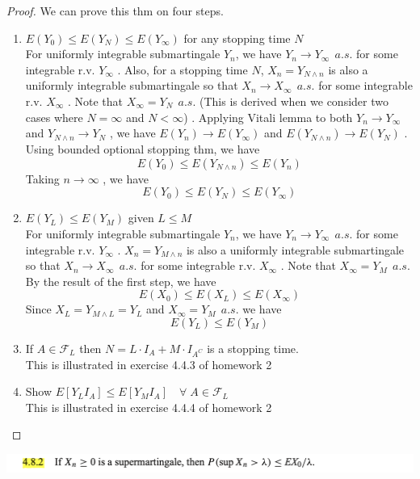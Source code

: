 \documentclass[12pt, A4]{article}
\newcommand{\F}{\mathcal{F}}
\begin{document}
\begin{proof}
    We can prove this thm on four steps.
    \begin{enumerate}
        \item $E(Y_0)\leq E(Y_N)\leq E(Y_\infty)$ for any stopping time $N$ \\
        For uniformly integrable submartingale $Y_n$, we have $Y_n\rightarrow Y_\infty\;\,a.s.$ for some integrable r.v. $Y_\infty$ . Also, for a stopping time $N$, $X_n = Y_{N\wedge n}$ is also a uniformly integrable submartingale so that $X_n\rightarrow X_\infty\;\,a.s.$ for some integrable r.v. $X_\infty$ . Note that $X_\infty = Y_N\;\,a.s.$ (This is derived when we consider two cases where $N=\infty$ and $N<\infty$) . Applying Vitali lemma to both $Y_n\rightarrow Y_\infty$ and $Y_{N\wedge n}\rightarrow Y_N$ , we have $E(Y_n) \rightarrow E(Y_\infty)$ and $E(Y_{N\wedge n})\rightarrow E(Y_N)$ . Using bounded optional stopping thm, we have $$ E(Y_0) \leq E(Y_{N\wedge n}) \leq E(Y_n)$$ Taking $n\rightarrow \infty$ , we have $$ E(Y_0) \leq E(Y_N) \leq E(Y_\infty)$$
        \item $E(Y_L)\leq E(Y_M)$ given $L\leq M$ \\
        For uniformly integrable submartingale $Y_n$, we have $Y_n\rightarrow Y_\infty\;\,a.s.$ for some integrable r.v. $Y_\infty$ . $X_n = Y_{M\wedge n}$ is also a uniformly integrable submartingale so that $X_n\rightarrow X_\infty\;\,a.s.$ for some integrable r.v. $X_\infty$ . Note that $X_\infty = Y_M\;\,a.s.$ By the result of the first step, we have $$ E(X_0) \leq E(X_L) \leq E(X_\infty) $$ Since $X_L = Y_{M\wedge L}=Y_L$ and $X_\infty = Y_M\;\,a.s.$ we have $$E(Y_L) \leq E(Y_M)$$
        \item If $A\in \F_L$ then $N = L\cdot I_A + M\cdot I_{A^C}$ is a stopping time. \\ This is illustrated in exercise 4.4.3 of homework 2
        \item Show $E[Y_L I_A] \leq E[Y_M I_A] \quad \forall \; A\in \F_L$ \\ This is illustrated in exercise 4.4.4 of homework 2
    \end{enumerate}
\end{proof}

\clearpage

\includegraphics[width=17cm]{Exer4.8.2.png}
\end{document}
